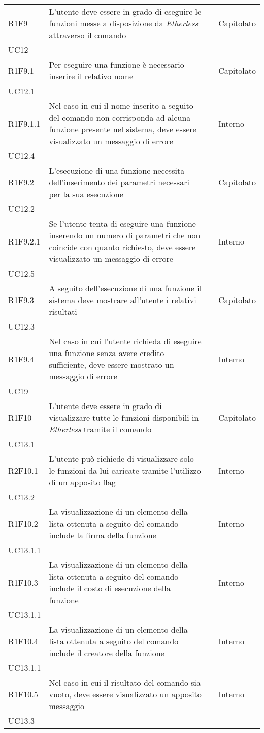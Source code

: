 \begin{longtable}{ 
		>{\centering}p{} 
		>{}p{} 
		>{\centering}p{}
		>{\centering}p{} }
	R1F9 & L'utente deve essere in grado di eseguire le funzioni messe a 
		disposizione da \textit{Etherless} attraverso il comando \run{}				& \ob & Capitolato \\ UC12 \tabularnewline
	R1F9.1 & Per eseguire una funzione è necessario inserire il relativo nome 		& \ob & Capitolato \\ UC12.1 \tabularnewline
	R1F9.1.1 & Nel caso in cui il nome inserito a seguito del comando \run{} non 
		corrisponda ad alcuna funzione presente nel sistema, deve essere 
		visualizzato un messaggio di errore											& \ob & Interno \\ UC12.4 \tabularnewline 
	R1F9.2 & L'esecuzione di una funzione necessita dell'inserimento dei parametri 
		necessari per la sua esecuzione												& \ob & Capitolato \\ UC12.2 \tabularnewline
	R1F9.2.1 & Se l'utente tenta di eseguire una funzione inserendo un numero 
		di parametri che non coincide con quanto richiesto, deve essere 
		visualizzato un messaggio di errore 										& \ob & Interno \\ UC12.5 \tabularnewline
	R1F9.3 & A seguito dell'esecuzione di una funzione il sistema deve mostrare 
		all'utente i relativi risultati 											& \ob & Capitolato \\ UC12.3 \tabularnewline
	R1F9.4 & Nel caso in cui l'utente richieda di eseguire una funzione senza 
		avere credito sufficiente, deve essere mostrato un messaggio di errore		& \ob & Interno \\ UC19 \tabularnewline
	
	R1F10 & L'utente deve essere in grado di visualizzare tutte le funzioni 
		disponibili in \textit{Etherless} tramite il comando \list{} 				& \ob & Capitolato \\ UC13.1 \tabularnewline
	R2F10.1 & L'utente può richiede di visualizzare solo le funzioni da 
		lui caricate tramite l'utilizzo di un apposito flag 						& \de & Interno \\ UC13.2 \tabularnewline
	R1F10.2 & La visualizzazione di un elemento della lista ottenuta a seguito 
		del comando \lista{} include la firma della funzione 						& \ob & Interno \\ UC13.1.1 \tabularnewline
	R1F10.3 & La visualizzazione di un elemento della lista ottenuta a seguito 
		del comando \lista{} include il costo di esecuzione della funzione 			& \ob & Interno \\ UC13.1.1 \tabularnewline
	R1F10.4 & La visualizzazione di un elemento della lista ottenuta a seguito 
		del comando \lista{} include il creatore della funzione 					& \ob & Interno \\ UC13.1.1 \tabularnewline
	R1F10.5 & Nel caso in cui il risultato del comando \lista{} sia vuoto, deve 
		essere visualizzato un apposito messaggio 									& \ob & Interno \\ UC13.3 \tabularnewline
	

\end{longtable}
